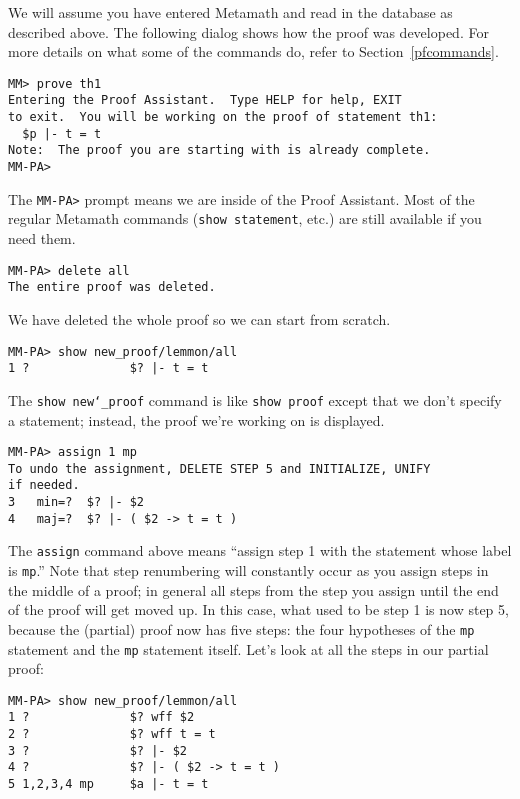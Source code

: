 We will assume you have entered Metamath and read in the database as described
above.  The following dialog shows how the proof was developed.  For more
details on what some of the commands do, refer to Section~\ref{pfcommands}.

\begin{verbatim}
MM> prove th1
Entering the Proof Assistant.  Type HELP for help, EXIT
to exit.  You will be working on the proof of statement th1:
  $p |- t = t
Note:  The proof you are starting with is already complete.
MM-PA>
\end{verbatim}

The \verb/MM-PA>/ prompt means we are inside of the Proof
Assistant. Most of the regular Metamath commands
(\texttt{show statement}, etc.) are still available if you need them.

\begin{verbatim}
MM-PA> delete all
The entire proof was deleted.
\end{verbatim}

We have deleted the whole proof so we can start from scratch.

\begin{verbatim}
MM-PA> show new_proof/lemmon/all
1 ?              $? |- t = t
\end{verbatim}

The \texttt{show new{\char`\_}proof} command is like \texttt{show proof} except that we
don't specify a statement; instead, the proof we're working on is
displayed.

\begin{verbatim}
MM-PA> assign 1 mp
To undo the assignment, DELETE STEP 5 and INITIALIZE, UNIFY
if needed.
3   min=?  $? |- $2
4   maj=?  $? |- ( $2 -> t = t )
\end{verbatim}

The \texttt{assign} command above means
``assign step 1 with the statement whose label is \texttt{mp}.''  Note
that step renumbering will constantly occur as you assign steps in the
middle of a proof; in general all steps from the step you assign until
the end of the proof will get moved up.  In this case, what used to be
step 1 is now step 5, because the (partial) proof now has five steps:
the four hypotheses of the \texttt{mp} statement and the \texttt{mp}
statement itself.  Let's look at all the steps in our partial proof:

\begin{verbatim}
MM-PA> show new_proof/lemmon/all
1 ?              $? wff $2
2 ?              $? wff t = t
3 ?              $? |- $2
4 ?              $? |- ( $2 -> t = t )
5 1,2,3,4 mp     $a |- t = t
\end{verbatim}

